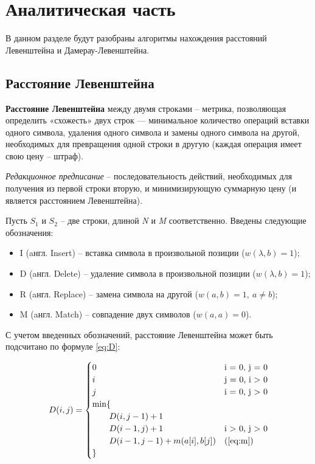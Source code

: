 \chapter{Аналитическая часть}

В данном разделе будут разобраны алгоритмы нахождения расстояний Левенштейна и Дамерау-Левенштейна.

\section{Расстояние Левенштейна}

\textbf{Расстояние Левенштейна} \cite{levenshtein} между двумя строками -- метрика, позволяющая определить «схожесть» двух строк — минимальное количество операций вставки одного символа, удаления одного символа и замены одного символа на другой, необходимых для превращения одной строки в другую (каждая операция имеет свою цену -- штраф). \newline


\textit{Редакционное предписание} -- последовательность действий, необходимых для получения из первой строки вторую, и минимизирующую суммарную цену (и является расстоянием Левенштейна).\newline


Пусть $S_{1}$ и $S_{2}$ -- две строки, длиной \textit{N} и \textit{M} соответственно. 
Введены следующие обозначения:
\begin{itemize}
        \item I (aнгл. Insert) -- вставка символа в произвольной позиции ($w(\lambda,b)=1$);
        \item D (aнгл. Delete) -- удаление символа в произвольной позиции ($w(\lambda,b)=1$);
        \item R (aнгл. Replace) -- замена символа на другой ($w(a,b)=1, \medspace a \neq b$);
        \item M (aнгл. Match) -- совпадение двух символов ($w(a,a)=0$). \newline
\end{itemize}


С учетом введенных обозначений, расстояние Левенштейна может быть подсчитано по формуле \ref{eq:D}:


\begin{equation}
	\label{eq:D}
	D(i, j) = \begin{cases}

		0 &\text{i = 0, j = 0}\\
		i &\text{j = 0, i > 0}\\
		j &\text{i = 0, j > 0}\\
		\min \lbrace \\
		\qquad D(i, j-1) + 1\\
		\qquad D(i-1, j) + 1 &\text{i > 0, j > 0}\\
		\qquad D(i-1, j-1) + m(a[i], b[j]) &\text(\ref{eq:m})\\
		\rbrace
	\end{cases}
\end{equation}


